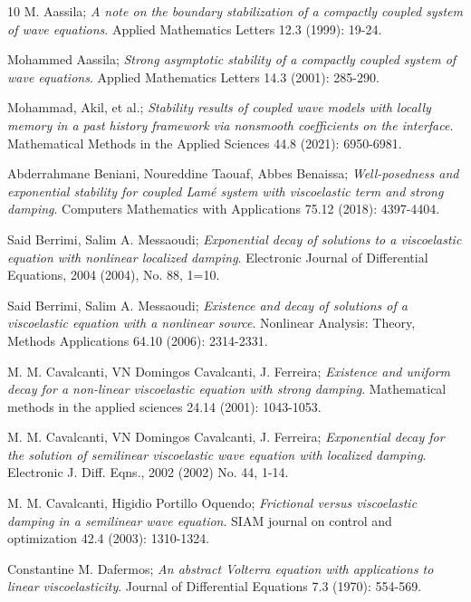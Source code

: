 \begin{thebibliography}{10}
 M. Aassila;
\emph{A note on the boundary stabilization of a compactly coupled system of wave
equations}.
 Applied Mathematics Letters 12.3 (1999): 19-24.

  Mohammed Aassila;
\emph{Strong asymptotic stability of a compactly coupled system of wave equations}.
Applied Mathematics Letters 14.3 (2001): 285-290.

  Mohammad, Akil, et al.;
\emph{Stability results of coupled wave models with locally memory in a past history
framework via nonsmooth coefficients on the interface}.
 Mathematical Methods in the Applied Sciences 44.8 (2021): 6950-6981.

 Abderrahmane Beniani,  Noureddine Taouaf,  Abbes Benaissa;
\emph{Well-posedness and exponential stability for coupled Lam\'e system with
viscoelastic term and strong damping}. Computers Mathematics with Applications 75.12 (2018): 4397-4404.

  Said Berrimi, Salim A. Messaoudi;
\emph{Exponential decay of solutions to a viscoelastic equation with nonlinear 
localized damping}. Electronic Journal of Differential Equations,
 2004 (2004), No. 88, 1=10.
 
 Said Berrimi, Salim A. Messaoudi;
\emph{Existence and decay of solutions of a viscoelastic equation with a 
nonlinear source}. Nonlinear Analysis: Theory, Methods Applications 64.10 
(2006): 2314-2331.

 M. M. Cavalcanti, VN Domingos Cavalcanti, J. Ferreira;
\emph{Existence and uniform decay for a non-linear viscoelastic equation with 
strong damping}. Mathematical methods in the applied sciences 24.14 (2001): 1043-1053.

 M. M. Cavalcanti, VN Domingos Cavalcanti, J. Ferreira;
\emph{Exponential decay for the solution of semilinear viscoelastic wave equation 
with localized damping}. Electronic J. Diff. Eqns., 2002 (2002) No. 44, 1-14.

 M. M. Cavalcanti, Higidio Portillo Oquendo;
\emph{Frictional versus viscoelastic damping in a semilinear wave equation}.
 SIAM journal on control and optimization 42.4 (2003): 1310-1324.
 
 Constantine M. Dafermos;
\emph{An abstract Volterra equation with applications to linear viscoelasticity}.
Journal of Differential Equations 7.3 (1970): 554-569.


\end{thebibliography}
